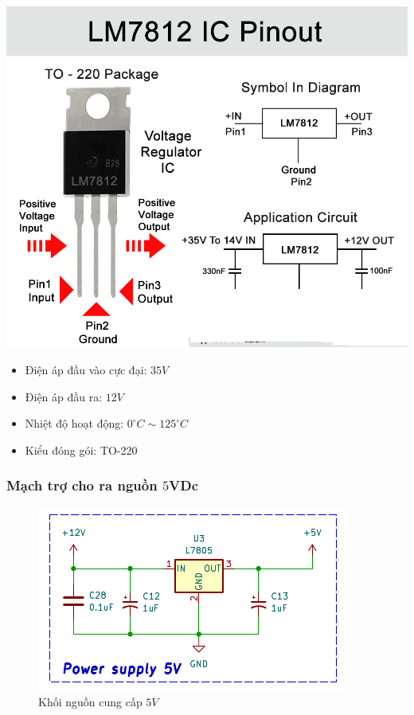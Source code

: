 \begin{itemize}[label= - ]
		\begin{minipage}{0.3\linewidth}
			\includegraphics[width=\linewidth]{./picture/lm7812.png}
		\end{minipage}
		\begin{minipage}{0.7\linewidth}
			\begin{itemize}[label = -]
				\item Điện áp đầu vào cực đại: $35V$
				\item Điện áp đầu ra: $12V$
				\item Nhiệt độ hoạt động: $0^{\circ}C \sim 125^{\circ}C$
				\item Kiểu đóng gói: TO-220
			\end{itemize}
		\end{minipage}
	\end{itemize}
	
	\subsubsection{Mạch trợ cho ra nguồn $5$VDc}
	
	\begin{figure}[H]
		\centering
		\includegraphics[width=0.7\linewidth]{./picture/power_supply_5V.pdf}
		\caption{Khối nguồn cung cấp $5V$}
		\label{power_supply_5V_hardware}
	\end{figure}
	
